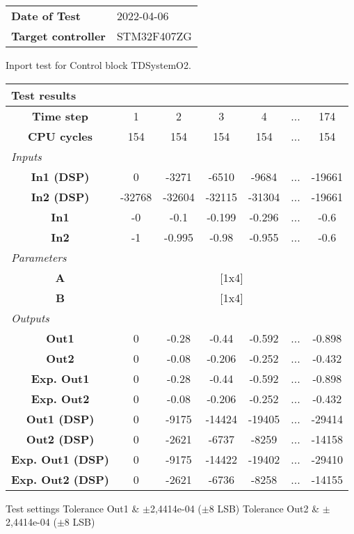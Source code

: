 \begin{tabular}{l l}
\textbf{Date of Test} & 2022-04-06 \tabularnewline
\textbf{Target controller} & STM32F407ZG \tabularnewline
\end{tabular}
\vspace{1ex}
Inport test for Control block TDSystemO2.

\vspace{1em}
\begin{tabularx}{\textwidth}{|c|c|c|c|c|>{\centering\arraybackslash}X|c|}
\hline
\multicolumn{7}{|l|}{\cellcolor[gray]{0.8}\textbf{Test results}} \tabularnewline \hline
\textbf{Time step} & 1 & 2 & 3 & 4 & ... & 174 \tabularnewline \hline
\textbf{CPU cycles} & 154 & 154 & 154 & 154 & ... & 154 \tabularnewline \hline
\multicolumn{7}{|l|}{\cellcolor[gray]{0.9}\textit{Inputs}} \tabularnewline \hline
\textbf{In1 (DSP)} & 0 & -3271 & -6510 & -9684 & ... & -19661 \tabularnewline \hline
\textbf{In2 (DSP)} & -32768 & -32604 & -32115 & -31304 & ... & -19661 \tabularnewline \hline
\textbf{In1} & -0 & -0.1 & -0.199 & -0.296 & ... & -0.6 \tabularnewline \hline
\textbf{In2} & -1 & -0.995 & -0.98 & -0.955 & ... & -0.6 \tabularnewline \hline
\multicolumn{7}{|l|}{\cellcolor[gray]{0.9}\textit{Parameters}} \tabularnewline \hline
\textbf{A} & \multicolumn{6}{c|}{[1x4]} \tabularnewline \hline
\textbf{B} & \multicolumn{6}{c|}{[1x4]} \tabularnewline \hline
\multicolumn{7}{|l|}{\cellcolor[gray]{0.9}\textit{Outputs}} \tabularnewline \hline
\textbf{Out1} & 0 & -0.28 & -0.44 & -0.592 & ... & -0.898 \tabularnewline \hline
\textbf{Out2} & 0 & -0.08 & -0.206 & -0.252 & ... & -0.432 \tabularnewline \hline
\textbf{Exp. Out1} & 0 & -0.28 & -0.44 & -0.592 & ... & -0.898 \tabularnewline \hline
\textbf{Exp. Out2} & 0 & -0.08 & -0.206 & -0.252 & ... & -0.432 \tabularnewline \hline
\textbf{Out1 (DSP)} & 0 & -9175 & -14424 & -19405 & ... & -29414 \tabularnewline \hline
\textbf{Out2 (DSP)} & 0 & -2621 & -6737 & -8259 & ... & -14158 \tabularnewline \hline
\textbf{Exp. Out1 (DSP)} & 0 & -9175 & -14422 & -19402 & ... & -29410 \tabularnewline \hline
\textbf{Exp. Out2 (DSP)} & 0 & -2621 & -6736 & -8258 & ... & -14155 \tabularnewline \hline
\end{tabularx}
\vspace{1ex}

\begin{XtoCtabular}{Test settings}
Tolerance Out1 & $\pm$2,4414e-04 ($\pm$8 LSB) \tabularnewline \hline
Tolerance Out2 & $\pm$2,4414e-04 ($\pm$8 LSB) \tabularnewline \hline
\end{XtoCtabular}

